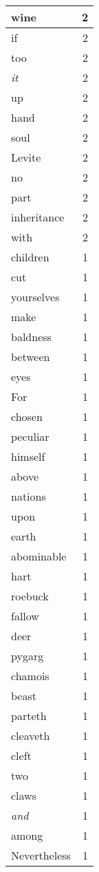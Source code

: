 \begin{center}
\begin{longtable}{l|r}
wine & 2 \\ \hline
if & 2 \\ \hline
too & 2 \\ \hline
\emph{it} & 2 \\ \hline
up & 2 \\ \hline
hand & 2 \\ \hline
soul & 2 \\ \hline
Levite & 2 \\ \hline
no & 2 \\ \hline
part & 2 \\ \hline
inheritance & 2 \\ \hline
with & 2 \\ \hline
children & 1 \\ \hline
cut & 1 \\ \hline
yourselves & 1 \\ \hline
make & 1 \\ \hline
baldness & 1 \\ \hline
between & 1 \\ \hline
eyes & 1 \\ \hline
For & 1 \\ \hline
chosen & 1 \\ \hline
peculiar & 1 \\ \hline
himself & 1 \\ \hline
above & 1 \\ \hline
nations & 1 \\ \hline
upon & 1 \\ \hline
earth & 1 \\ \hline
abominable & 1 \\ \hline
hart & 1 \\ \hline
roebuck & 1 \\ \hline
fallow & 1 \\ \hline
deer & 1 \\ \hline
pygarg & 1 \\ \hline
chamois & 1 \\ \hline
beast & 1 \\ \hline
parteth & 1 \\ \hline
cleaveth & 1 \\ \hline
cleft & 1 \\ \hline
two & 1 \\ \hline
claws & 1 \\ \hline
\emph{and} & 1 \\ \hline
among & 1 \\ \hline
Nevertheless & 1 \\ \hline

\end{longtable}
\end{center}
